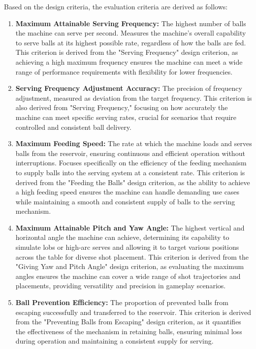 \documentclass[12pt]{report}
\begin{document}
Based on the design criteria, the evaluation criteria are derived as follows:
\begin{enumerate}
    \item \textbf{Maximum Attainable Serving Frequency:} The highest number of balls the machine can serve per second. Measures the machine's overall capability to serve balls at its highest possible rate, regardless of how the balls are fed. This criterion is derived from the "Serving Frequency" design criterion, as achieving a high maximum frequency ensures the machine can meet a wide range of performance requirements with flexibility for lower frequencies.

    \item \textbf{Serving Frequency Adjustment Accuracy:} The precision of frequency adjustment, measured as deviation from the target frequency. This criterion is also derived from "Serving Frequency," focusing on how accurately the machine can meet specific serving rates, crucial for scenarios that require controlled and consistent ball delivery.

    \item \textbf{Maximum Feeding Speed:} The rate at which the machine loads and serves balls from the reservoir, ensuring continuous and efficient operation without interruptions. Focuses specifically on the efficiency of the feeding mechanism to supply balls into the serving system at a consistent rate. This criterion is derived from the "Feeding the Balls" design criterion, as the ability to achieve a high feeding speed ensures the machine can handle demanding use cases while maintaining a smooth and consistent supply of balls to the serving mechanism.

    \item \textbf{Maximum Attainable Pitch and Yaw Angle:} The highest vertical and horizontal angle the machine can achieve, determining its capability to simulate lobs or high-arc serves and allowing it to target various positions across the table for diverse shot placement. This criterion is derived from the "Giving Yaw and Pitch Angle" design criterion, as evaluating the maximum angles ensures the machine can cover a wide range of shot trajectories and placements, providing versatility and precision in gameplay scenarios.


    \item \textbf{Ball Prevention Efficiency:} The proportion of prevented balls from escaping successfully and transferred to the reservoir. This criterion is derived from the "Preventing Balls from Escaping" design criterion, as it quantifies the effectiveness of the mechanism in retaining balls, ensuring minimal loss during operation and maintaining a consistent supply for serving.


\end{enumerate}
\end{document}
